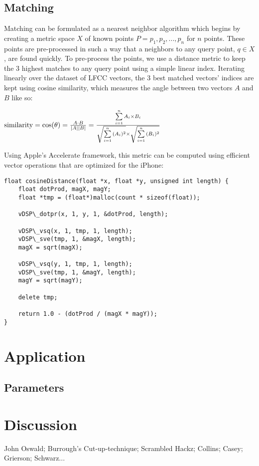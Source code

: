
\subsection{Matching}

Matching can be formulated as a nearest neighbor algorithm which begins by creating a metric space $X$ of known points $P = p_1, p_2, ..., p_n$ for $n$ points.  These points are pre-processed in such a way that a neighbors to any query point, $q \in X$, are found quickly.  To pre-process the points, we use a distance metric to keep the 3 highest matches to any query point using a simple linear index.  Iterating linearly over the dataset of LFCC vectors, the 3 best matched vectors' indices are kept using cosine similarity, which measures the angle between two vectors $A$ and $B$ like so:

\begin{math}
\textnormal{similarity} = \cos(\theta) = {A \cdot B \over |A| |B|} = \frac{ \sum\limits_{i=1}^{n}{A_i \times B_i} }{ \\ \sqrt{\sum\limits_{i=1}^{n}{(A_i)^2}} \times \sqrt{\sum\limits_{i=1}^{n}{(B_i)^2}}} 
\end{math}

Using Apple's Accelerate framework, this metric can be computed using efficient vector operations that are optimized for the iPhone:
\clearpage
\begin{lstlisting}
float cosineDistance(float *x, float *y, unsigned int length) {
	float dotProd, magX, magY;
	float *tmp = (float*)malloc(count * sizeof(float));
	
	vDSP\_dotpr(x, 1, y, 1, &dotProd, length);
	
	vDSP\_vsq(x, 1, tmp, 1, length);
	vDSP\_sve(tmp, 1, &magX, length);
	magX = sqrt(magX);
	
	vDSP\_vsq(y, 1, tmp, 1, length);
	vDSP\_sve(tmp, 1, &magY, length);
	magY = sqrt(magY);
	
	delete tmp;
	
	return 1.0 - (dotProd / (magX * magY));
}
\end{lstlisting}

\section{Application}

\subsection{Parameters}
\label{subsec:parameters}

\section{Discussion}

John Oswald; Burrough's Cut-up-technique; Scrambled Hackz; Collins; Casey; Grierson; Schwarz...